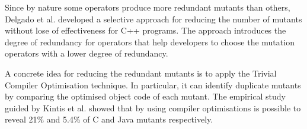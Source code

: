 Since by nature some operators produce more redundant mutants than others, Delgado et al. \cite{delgado2017assessment} developed a selective approach for reducing the number of mutants without lose of effectiveness for C++ programs. The approach introduces the degree of redundancy for operators that help developers to choose the mutation operators with a lower degree of redundancy.

A concrete idea for reducing the redundant mutants is to apply the Trivial Compiler Optimisation \cite{papadakis2015trivial, kintis2017detecting,papadakis2019mutation} technique. In particular, it can identify duplicate mutants by comparing the optimised object code of each mutant. The empirical study guided by Kintis et al. \cite{kintis2017detecting} showed that by using compiler optimisations is possible to reveal 21\% and 5.4\% of C and Java mutants respectively.






